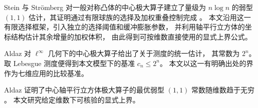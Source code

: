 
Stein 与 Strömberg 对一般对称凸体的中心极大算子建立了量级为
$n\log n$ 的弱型 $(1,1)$ 估计，其证明通过有限球族的选择及加权重叠控制完成
\cite[Section~2, pp.~260--263]{SteinStromberg1983}。
本文沿用这一有限选择框架，引入独立的选择阈值和缓冲膨胀参数，
并利用轴平行立方体的坐标结构估计其余增量的加权体积，
由此得到可按维数直接使用的显式上界公式。

Aldaz 对 $\ell^\infty$ 几何下的中心极大算子给出了关于测度的统一估计，
其常数为 $2^n$\cite[Corollary~3.5]{Aldaz2020Kissing}。
取 Lebesgue 测度便得到本文模型下的基准 $c_n\le 2^n$。
本文以这一有明确出处的界作为七维应用的比较基准。

Aldaz 证明了中心轴平行立方体极大算子的最优弱型 $(1,1)$ 常数随维数趋于无穷
\cite{Aldaz2011Cubes}。
本文研究给定维数下可核验的显式上界。


